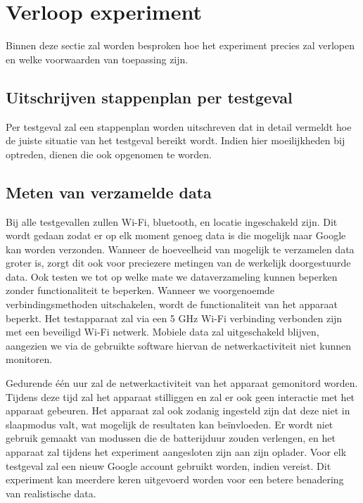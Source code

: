 \section{Verloop experiment}
\label{sec:conditionsexperiment}
Binnen deze sectie zal worden besproken hoe het experiment precies zal verlopen en welke voorwaarden van toepassing zijn.

\subsection{Uitschrijven stappenplan per testgeval}
Per testgeval zal een stappenplan worden uitschreven dat in detail vermeldt hoe de juiste situatie van het testgeval bereikt wordt. Indien hier moeilijkheden bij optreden, dienen die ook opgenomen te worden.

\subsection{Meten van verzamelde data}
Bij alle testgevallen zullen Wi-Fi, bluetooth, en locatie ingeschakeld zijn. Dit wordt gedaan zodat er op elk moment genoeg data is die mogelijk naar Google kan worden verzonden. Wanneer de hoeveelheid van mogelijk te verzamelen data groter is, zorgt dit ook voor preciezere metingen van de werkelijk doorgestuurde data. Ook  testen we tot op welke mate we dataverzameling kunnen beperken zonder functionaliteit te beperken. Wanneer we voorgenoemde verbindingsmethoden uitschakelen, wordt de functionaliteit van het apparaat beperkt. Het testapparaat zal via een 5 GHz Wi-Fi verbinding verbonden zijn met een beveiligd Wi-Fi netwerk. Mobiele data zal uitgeschakeld blijven, aangezien we via de gebruikte software hiervan de netwerkactiviteit niet kunnen monitoren.

Gedurende één uur zal de netwerkactiviteit van het apparaat gemonitord worden. Tijdens deze tijd zal het apparaat stilliggen en zal er ook geen interactie met het apparaat gebeuren. Het apparaat zal ook zodanig ingesteld zijn dat deze niet in slaapmodus valt, wat mogelijk de resultaten kan beïnvloeden. Er wordt niet gebruik gemaakt van modussen die de batterijduur zouden verlengen, en het apparaat zal tijdens het experiment aangesloten zijn aan zijn oplader. Voor elk testgeval zal een nieuw Google account gebruikt worden, indien vereist. Dit experiment kan meerdere keren uitgevoerd worden voor een betere benadering van realistische data.




